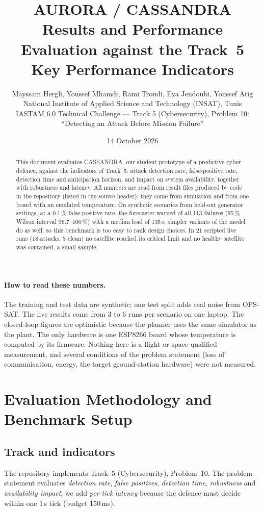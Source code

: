 \documentclass[10pt,a4paper]{article}
\title{\textbf{AURORA / CASSANDRA}\\[2pt]
\large Results and Performance Evaluation against the Track~5 Key Performance Indicators}
\author{Mayssam Hergli, Youssef Mhamdi, Rami Troudi, Eya Jendoubi, Youssef Atig\\
\small National Institute of Applied Science and Technology (INSAT), Tunis\\
\small IASTAM 6.0 Technical Challenge --- Track 5 (Cybersecurity), Problem 10:
``Detecting an Attack Before Mission Failure''}
\date{14 October 2026}
\begin{document}
\maketitle

\begin{abstract}
\noindent This document evaluates CASSANDRA, our student prototype of a predictive cyber defence,
against the indicators of Track~5: attack detection rate, false-positive rate, detection time and
anticipation horizon, and impact on system availability, together with robustness and latency. All
numbers are read from result files produced by code in the repository (listed in the source header);
they come from simulation and from one board with an emulated temperature. On synthetic scenarios from
held-out generator settings, at a 0.1\,\% false-positive rate, the forecaster warned of all 113 failures
(95\,\% Wilson interval 96.7--100\,\%) with a median lead of 135\,s; simpler variants of the model do
as well, so this benchmark is too easy to rank design choices. In 21 scripted live runs (18 attacks,
3 clean) no satellite reached its critical limit and no healthy satellite was contained, a small sample.
\end{abstract}

\paragraph{How to read these numbers.} The training and test data are synthetic; one test split adds
real noise from OPS-SAT. The live results come from 3 to 6 runs per scenario on one laptop. The
closed-loop figures are optimistic because the planner uses the same simulator as the plant. The only
hardware is one ESP8266 board whose temperature is computed by its firmware. Nothing here is a flight or
space-qualified measurement, and several conditions of the problem statement (loss of communication,
energy, the target ground-station hardware) were not measured.

\section{Evaluation Methodology and Benchmark Setup}
\label{sec:method}

\subsection{Track and indicators}
The repository implements Track~5 (Cybersecurity), Problem~10. The problem statement evaluates
\emph{detection rate}, \emph{false positives}, \emph{detection time}, \emph{robustness} and
\emph{availability impact}; we add \emph{per-tick latency} because the defence must decide within one
1\,s tick (budget 150\,ms).
\end{document}
